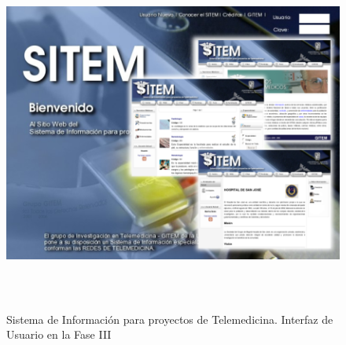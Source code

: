 \begin{figure}
 \centering
 \includegraphics[width=156mm, height=118mm]{pagina_principal.png}
 \caption{Sistema de Información para proyectos de Telemedicina. Interfaz de Usuario en la Fase III}
 \label{sitem_faseIII}
\end{figure}